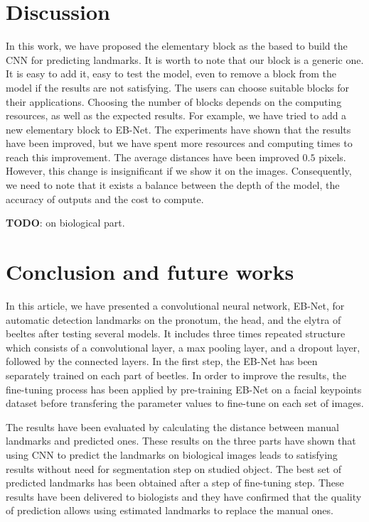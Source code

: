 \documentclass[review]{elsarticle}
\begin{document}
\section{Discussion}
In this work, we have proposed the elementary block as the based to build the CNN for predicting landmarks. It is worth to note that our block is a generic one. It is easy to add it, easy to test the model, even to remove a block from the model if the results are not satisfying. The users can choose suitable blocks for their applications. Choosing the number of blocks depends on the computing resources, as well as the expected results. For example, we have tried to add a new elementary block to EB-Net. The experiments have shown that the results have been improved, but we have spent more resources and computing times to reach this improvement. The average distances have been improved $0.5$ pixels. However, this change is insignificant if we show it on the images. Consequently, we need to note that it exists a balance between the depth of the model, the accuracy of outputs and the cost to compute.

\textbf{TODO}: on biological part.

\section{Conclusion and future works}
In this article, we have presented a convolutional neural network, EB-Net, for automatic detection landmarks on the pronotum, the head, and the elytra of beeltes after testing several models. It includes three times repeated structure which consists of a convolutional layer, a max pooling layer, and a dropout layer, followed by the connected layers. In the first step, the EB-Net has been separately trained on each part of beetles. In order to improve the results, the fine-tuning process has been applied by pre-training EB-Net on a facial keypoints dataset before transfering the parameter values to fine-tune on each set of images.

The results have been evaluated by calculating the distance between manual landmarks and predicted ones. These results on the three parts have shown that using CNN to predict the landmarks on biological images leads to satisfying results without need for segmentation step on studied object. The best set of predicted landmarks has been obtained after a step of fine-tuning step. These results have been delivered to biologists and they have confirmed that the quality of prediction allows using estimated landmarks to replace the manual ones.
\end{document}
